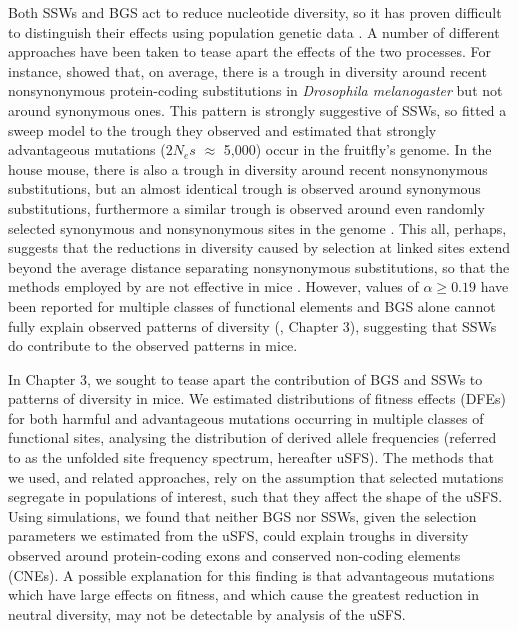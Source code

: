 \documentclass[11pt]{article}
\begin{document}
	Both SSWs and BGS act to reduce nucleotide diversity, so it has proven difficult to distinguish their effects using population genetic data \citep{RN339}. A number of different approaches have been taken to tease apart the effects of the two processes. For instance, \cite{RN167} showed that, on average, there is a trough in diversity around recent nonsynonymous protein-coding substitutions in \textit{Drosophila melanogaster} but not around synonymous ones. This pattern is strongly suggestive of SSWs, so \cite{RN167} fitted a sweep model to the trough they observed and estimated that strongly advantageous mutations ($2N_es$ $\approx$ 5,000) occur in the fruitfly's genome.  In the house mouse, there is also a trough in diversity around recent nonsynonymous substitutions, but an almost identical trough is observed around synonymous substitutions, furthermore a similar trough is observed around even randomly selected synonymous and nonsynonymous sites in the genome \citep{RN122}. This all, perhaps, suggests that the reductions in diversity caused by selection at linked sites extend beyond the average distance separating nonsynonymous substitutions, so that the methods employed by \cite{RN167} are not effective in mice \citep{RN122}. However, values of $\alpha \geq 0.19$ have been reported for  multiple classes of functional elements \citep{RN122} and BGS alone cannot fully explain observed patterns of diversity (\citealt{RN122}, Chapter 3), suggesting that SSWs do contribute to the observed patterns in mice.

	In Chapter 3, we sought to tease apart the contribution of BGS and SSWs to patterns of diversity in mice. We estimated distributions of fitness effects (DFEs) for both harmful and advantageous mutations occurring in multiple classes of functional sites, analysing the distribution of derived allele frequencies (referred to as the unfolded site frequency spectrum, hereafter uSFS). The methods that we used, and related approaches, rely on the assumption that selected mutations segregate in populations of interest, such that they affect the shape of the uSFS. Using simulations, we found that neither BGS nor SSWs, given the selection parameters we estimated from the uSFS, could explain troughs in diversity observed around protein-coding exons and conserved non-coding elements (CNEs). A possible explanation for this finding is that advantageous mutations which have large effects on fitness, and which cause the greatest reduction in neutral diversity, may not be detectable by analysis of the uSFS. 
\end{document}
